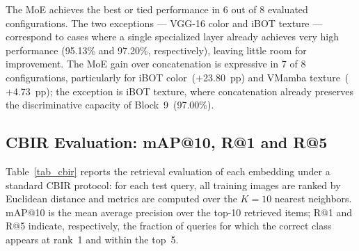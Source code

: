 \documentclass[conference]{IEEEtran}
\begin{document}
The MoE achieves the best or tied performance in 6 out of 8 evaluated
configurations.
The two exceptions — VGG-16 color and iBOT texture — correspond to cases
where a single specialized layer already achieves very high performance
(95.13\% and 97.20\%, respectively), leaving little room for improvement.
The MoE gain over concatenation is expressive in 7 of 8 configurations,
particularly for iBOT color~($+$23.80~pp) and VMamba texture~($+$4.73~pp);
the exception is iBOT texture, where concatenation already preserves the
discriminative capacity of Block~9~(97.00\%).

\subsection{CBIR Evaluation: mAP@10, R@1 and R@5}

Table~\ref{tab_cbir} reports the retrieval evaluation of each embedding
under a standard CBIR protocol: for each test query, all training images
are ranked by Euclidean distance and metrics are computed over the
$K\!=\!10$ nearest neighbors.
mAP@10 is the mean average precision over the top-10 retrieved items;
R@1 and R@5 indicate, respectively, the fraction of queries for which
the correct class appears at rank~1 and within the top~5.
\end{document}
